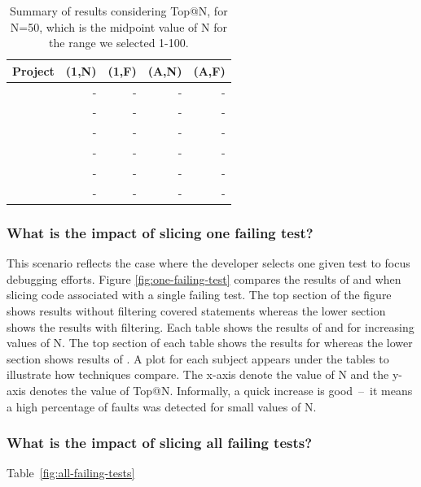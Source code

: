 \documentclass[sigplan,10pt,review,anonymous]{acmart}\settopmatter{printfolios=true,printccs=false,printacmref=false}
\begin{document}


\begin{table}[h]
  \centering
  \setlength{\tabcolsep}{4pt}
    \begin{tabular}{lrrrr}
      \toprule
      Project            & (1,N) & (1,F) & (A,N) & (A,F)  \\
      \midrule
      \lang{}            & -  & - & -  & - \\
      \cmath{}           & -  & - & -  & - \\
      \closure{}         & -  & - & -  & - \\
      \chart{}           & -  & - & -  & - \\
      \jtime{}           & -  & - & -  & - \\
      \mockito{}         & -  & - & -  & - \\
      \bottomrule
  \end{tabular}
\caption {\label{tab:summary}Summary of results considering Top@N, for
  N=50, which is the midpoint value of N for the range we selected
  1-100.}
\end{table}
\normalsize

\subsubsection{What is the impact of slicing one failing test?}
This scenario reflects the case where the developer selects one given
test to focus debugging efforts. Figure \ref{fig:one-failing-test}
compares the results of \sfl{} and \comb{} when slicing code
associated with a single failing test. The top section of the figure
shows results without filtering covered statements whereas the lower
section shows the results with filtering. Each table shows the results of \sfl{} and \comb{}
for increasing values of N.  The top section of each table shows the
results for \sfl{} whereas the lower section shows results of
\comb{}. A plot for each subject appears under the tables to
illustrate how techniques compare. The x-axis denote the value of N
and the y-axis denotes the value of Top@N. Informally, a quick
increase is good~--~it means a high percentage of faults was detected
for small values of N.

\subsubsection{What is the impact of slicing all failing tests?}
Table~\ref{fig:all-failing-tests} 
\end{document}
